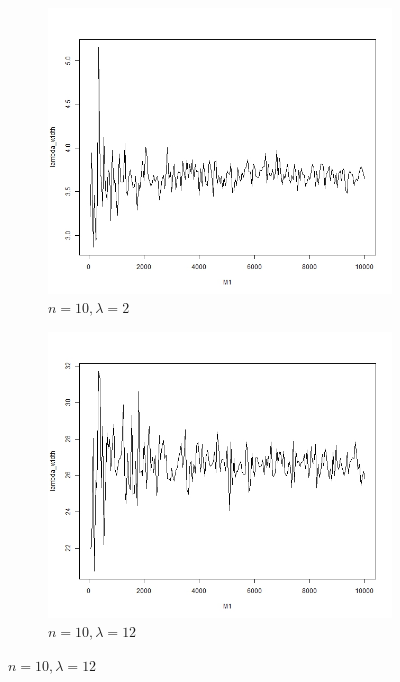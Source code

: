 \documentclass{article}
\begin{document}
        \begin{figure}[!htb]
        \centering
    	\begin{subfigure}[b]{0.5\textwidth}
    	\includegraphics[width = \textwidth]{./Codes/lambda_10_2.jpg}
    	\caption{$n = 10, \lambda = 2$}
    	\end{subfigure}%
    	\begin{subfigure}[b]{0.5\textwidth}
    	\includegraphics[width = \textwidth]{./Codes/lambda_10_12.jpg}
    	\caption{$n = 10, \lambda = 12$}
    	\end{subfigure}%


\end{figure}
\end{document}
